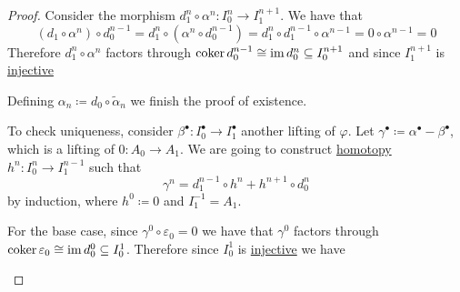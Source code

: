 \documentclass[../../../main]{subfiles}
\begin{document}
\begin{proof}
  Consider the morphism \(d_{1}^{n} \circ \alpha^{n}: I_{0}^{n} \to I_{1}^{n+1}\).
  We have that
  \begin{equation*}
    (d_{1} \circ \alpha^{n}) \circ d_{0}^{n-1} = d_{1}^{n} \circ (\alpha^{n} \circ d_{0}^{n-1}) = d_{1}^{n} \circ d_{1}^{n-1} \circ \alpha^{n-1} = 0 \circ \alpha^{n-1} = 0
  \end{equation*}
  Therefore \(d_{1}^{n} \circ \alpha^{n}\) factors through \(\operatorname*{coker} d_{0}^{n-1} \cong \operatorname{im} d_{0}^{n} \subseteq I_{0}^{n+1}\) and since \(I_{1}^{n+1}\) is \hyperref[def:injective-projective-object]{injective}
  \begin{center}
  \end{center}
  Defining \(\alpha_{n} \coloneq d_{0} \circ \widetilde{\alpha}_{n}\) we finish the proof of existence.
  
  To check uniqueness, consider \(\beta^{\bullet}: I_{0}^{\bullet} \to I_{1}^{\bullet}\) another lifting of \(\varphi\).
  Let \(\gamma^{\bullet} \coloneq \alpha^{\bullet} - \beta^{\bullet}\), which is a lifting of \(0: A_{0} \to A_{1}\).
  We are going to construct \hyperref[def:homotopy]{homotopy} \(h^{n}: I_{0}^{n} \to I_{1}^{n-1}\) such that
  \begin{equation*}
    \gamma^{n} = d_{1}^{n-1} \circ h^{n} + h^{n+1} \circ d_{0}^{n}
  \end{equation*}
  by induction, where \(h^{0} \coloneq 0\) and \(I_{1}^{-1} = A_{1}\).

  For the base case, since \(\gamma^{0} \circ \varepsilon_{0} = 0\) we have that \(\gamma^{0}\) factors through \(\operatorname*{coker} \varepsilon_{0} \cong \operatorname{im} d_{0}^{0} \subseteq I_{0}^{1}\).
  Therefore since \(I_{0}^{1}\) is \hyperref[def:injective-projective-object]{injective} we have
  \begin{center}
  \end{center}
\end{proof}
\end{document}
